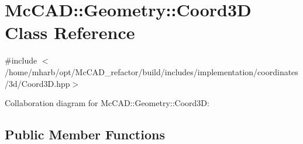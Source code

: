 \hypertarget{classMcCAD_1_1Geometry_1_1Coord3D}{}\section{Mc\+C\+AD\+:\+:Geometry\+:\+:Coord3D Class Reference}
\label{classMcCAD_1_1Geometry_1_1Coord3D}


{\ttfamily \#include $<$/home/mharb/opt/\+Mc\+C\+A\+D\+\_\+refactor/build/includes/implementation/coordinates/3d/\+Coord3\+D.\+hpp$>$}



Collaboration diagram for Mc\+C\+AD\+:\+:Geometry\+:\+:Coord3D\+:
\subsection*{Public Member Functions}

